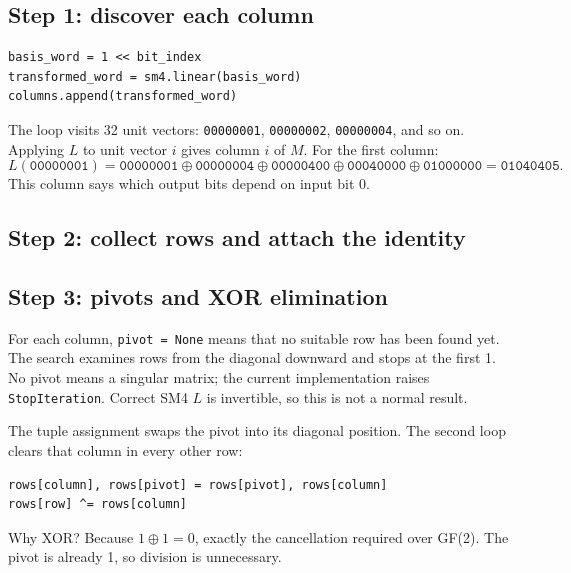 \documentclass[11pt,a4paper]{article}
\newcommand{\hx}[1]{\texttt{#1}}
\newcommand{\xor}{\mathbin{\oplus}}
\begin{document}
\subsection{Step 1: discover each column}
\begin{Verbatim}
basis_word = 1 << bit_index
transformed_word = sm4.linear(basis_word)
columns.append(transformed_word)
\end{Verbatim}
The loop visits 32 unit vectors: \hx{00000001}, \hx{00000002}, \hx{00000004},
and so on. Applying $L$ to unit vector $i$ gives column $i$ of $M$.
For the first column:
\[
L(\texttt{00000001})=
\texttt{00000001}\xor\texttt{00000004}\xor\texttt{00000400}
\xor\texttt{00040000}\xor\texttt{01000000}=\texttt{01040405}.
\]
This column says which output bits depend on input bit 0.

\subsection{Step 2: collect rows and attach the identity}


\subsection{Step 3: pivots and XOR elimination}
For each column, \hx{pivot = None} means that no suitable row has been found yet.
The search examines rows from the diagonal downward and stops at the first 1.
No pivot means a singular matrix; the current implementation raises
\hx{StopIteration}. Correct SM4 $L$ is invertible, so this is not a normal result.

The tuple assignment swaps the pivot into its diagonal position. The second
loop clears that column in every other row:
\begin{Verbatim}
rows[column], rows[pivot] = rows[pivot], rows[column]
rows[row] ^= rows[column]
\end{Verbatim}
Why XOR? Because $1\xor1=0$, exactly the cancellation required over GF(2).
The pivot is already 1, so division is unnecessary.
\end{document}
